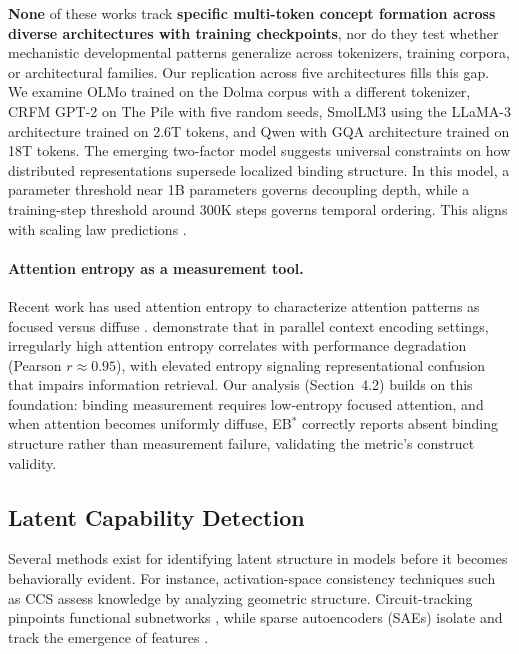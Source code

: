 \documentclass[10pt]{article} %
\begin{document}
\textbf{None} of these works track \textbf{specific multi-token concept formation across diverse architectures with training checkpoints}, nor do they test whether mechanistic developmental patterns generalize across tokenizers, training corpora, or architectural families.
Our replication across five architectures fills this gap. We examine OLMo trained on the Dolma corpus with a different tokenizer, CRFM GPT-2 on The Pile with five random seeds, SmolLM3 using the LLaMA-3 architecture trained on 2.6T tokens, and Qwen with GQA architecture trained on 18T tokens.
The emerging two-factor model suggests universal constraints on how distributed representations supersede localized binding structure. In this model, a parameter threshold near 1B parameters governs decoupling depth, while a training-step threshold around 300K steps governs temporal ordering. This aligns with scaling law predictions \citep{kaplan2020scaling}.

\paragraph{Attention entropy as a measurement tool.}
Recent work has used attention entropy to characterize attention patterns as focused versus diffuse \citep{clark2019what}.
\citet{zhang-etal-2025-attention} demonstrate that in parallel context encoding settings, irregularly high attention entropy correlates with performance degradation (Pearson $r\approx0.95$), with elevated entropy signaling representational confusion that impairs information retrieval.
Our analysis (Section~4.2) builds on this foundation: binding measurement requires low-entropy focused attention, and when attention becomes uniformly diffuse, EB$^*$ correctly reports absent binding structure rather than measurement failure, validating the metric's construct validity.

\subsection{Latent Capability Detection}

Several methods exist for identifying latent structure in models before it becomes behaviorally evident.
For instance, activation-space consistency techniques such as CCS \citep{burns2022discovering} assess knowledge by analyzing geometric structure.
Circuit-tracking pinpoints functional subnetworks \citep{wang2023interpretability}, while sparse autoencoders (SAEs) isolate and track the emergence of features \citep{bricken2023monosemanticity,cunningham2023sparse}.
\end{document}
